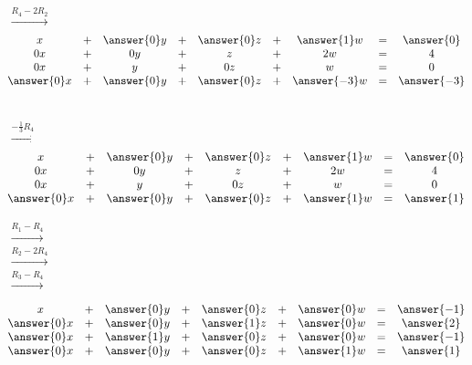 \documentclass{ximera}
\begin{document}
\begin{exploration}
\begin{center}
$\begin{array}{c}
\\
\\
 \\
\xrightarrow{R_4-2R_2}\\
 \end{array}$
$\begin{matrix}
      x &+ &\answer{0}y&+&\answer{0}z&+&\answer{1}w&= &\answer{0} \\
	 0x& +&0y&+&z&+&2w&=&4\\
     0x& +&y&+&0z&+&w&=&0\\
     \answer{0}x&+&\answer{0}y&+& \answer{0}z&+& \answer{-3}w&=& \answer{-3}
    \end{matrix}$


$\begin{array}{c}
\\
 \\
 \\
\xrightarrow{-\frac{1}{3}R_4}\\
 \end{array}$
$\begin{matrix}
      x &+ &\answer{0}y&+&\answer{0}z&+&\answer{1}w&= &\answer{0} \\
	 0x& +&0y&+&z&+&2w&=&4\\
     0x& +&y&+&0z&+&w&=&0\\
     \answer{0}x&+&\answer{0}y&+&\answer{0}z&+& \answer{1}w&=&\answer{1}
    \end{matrix}$
    

$\begin{array}{c}
 \xrightarrow{R_1-R_4}\\
 \xrightarrow{R_2-2R_4}\\
\xrightarrow{R_3-R_4}\\
\\
 \end{array}$
$\begin{matrix}
      x &+ &\answer{0}y&+&\answer{0}z&+& \answer{0}w&= & \answer{-1} \\
	 \answer{0}x& +&\answer{0}y&+&\answer{1}z&+& \answer{0}w&=& \answer{2}\\
     \answer{0}x& +&\answer{1}y&+&\answer{0}z&+& \answer{0}w&=& \answer{-1}\\
     \answer{0}x&+&\answer{0}y&+&\answer{0}z&+&\answer{1}w&=&\answer{1}
    \end{matrix}$
\end{center}    


\end{exploration}
\end{document}
